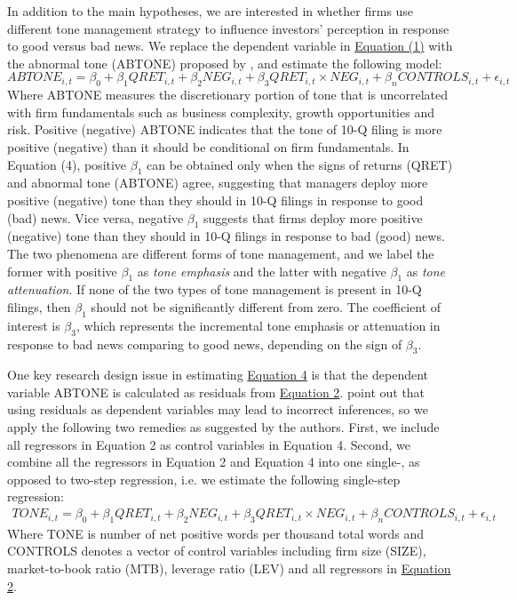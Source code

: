 \documentclass[a4paper]{article}
\begin{document}
\begin{spacing}{2}
In addition to the main hypotheses, we are interested in whether firms use different tone management strategy to influence investors' perception in response to good versus bad news. We replace the dependent variable in \hyperref[eq1]{Equation (1)} with the abnormal tone (ABTONE) proposed by \citet{huangToneManagement2014}, and estimate the following model:
\begin{equation} \label{eq4}
ABTONE_{i,t}=\beta_0+\beta_1QRET_{i,t}+\beta_2NEG_{i,t}+\beta_3QRET_{i,t}\times NEG_{i,t}+\beta_nCONTROLS_{i,t}+\epsilon_{i,t}
\end{equation}
Where ABTONE measures the discretionary portion of tone that is uncorrelated with firm fundamentals such as business complexity, growth opportunities and risk. Positive (negative) ABTONE indicates that the tone of 10-Q filing is more positive (negative) than it should be conditional on firm fundamentals. In Equation (4), positive $\beta_1$ can be obtained only when the signs of returns (QRET) and abnormal tone (ABTONE) agree, suggesting that managers deploy more positive (negative) tone than they should in 10-Q filings in response to good (bad) news. Vice versa, negative $\beta_1$ suggests that firms deploy more positive (negative) tone than they should in 10-Q filings in response to bad (good) news. The two phenomena are different forms of tone management, and we label the former with positive $\beta_1$ as \textit{tone emphasis} and the latter with negative $\beta_1$ as \textit{tone attenuation}. If none of the two types of tone management is present in 10-Q filings, then $\beta_1$ should not be significantly different from zero. The coefficient of interest is $\beta_3$, which represents the incremental tone emphasis or attenuation in response to bad news comparing to good news, depending on the sign of $\beta_3$.

One key research design issue in estimating \hyperref[eq4]{Equation 4} is that the dependent variable ABTONE is calculated as residuals from \hyperref[eq2]{Equation 2}. \citet*{chenIncorrectInferencesWhen2018} point out that using residuals as dependent variables may lead to incorrect inferences, so we apply the following two remedies as suggested by the authors. First, we include all regressors in Equation 2 as control variables in Equation 4. Second, we combine all the regressors in Equation 2 and Equation 4 into one single-, as opposed to two-step regression, i.e. we estimate the following single-step regression:
\begin{equation} \label{eq5}
\begin{split}
TONE_{i,t}=\beta_0+\beta_1QRET_{i,t}+\beta_2NEG_{i,t}+\beta_3QRET_{i,t}\times NEG_{i,t}+\beta_nCONTROLS_{i,t}+\epsilon_{i,t}
\end{split}
\end{equation}
Where TONE is number of net positive words per thousand total words and CONTROLS denotes a vector of control variables including firm size (SIZE), market-to-book ratio (MTB), leverage ratio (LEV) and all regressors in \hyperref[eq2]{Equation 2}.


\end{spacing}
\end{document}
